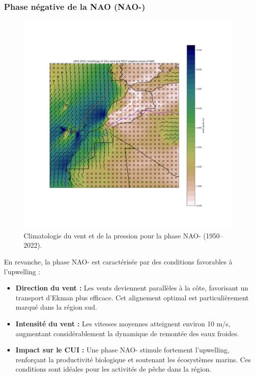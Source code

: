 \subsubsection*{Phase négative de la NAO (NAO-)}
\begin{figure}[H]
\centering
\includegraphics[scale=0.3]{NEG_PHASE.png}
\caption{Climatologie du vent et de la pression pour la phase NAO- (1950–2022).}
\label{fig:nao_negative}
\end{figure}

En revanche, la phase NAO- est caractérisée par des conditions favorables à l’upwelling :
\begin{itemize}
    \item \textbf{Direction du vent :} Les vents deviennent parallèles à la côte, favorisant un transport d'Ekman plus efficace. Cet alignement optimal est particulièrement marqué dans la région sud.
    \item \textbf{Intensité du vent :} Les vitesses moyennes atteignent environ 10 m/s, augmentant considérablement la dynamique de remontée des eaux froides.
    \item \textbf{Impact sur le CUI :} Une phase NAO- stimule fortement l’upwelling, renforçant la productivité biologique et soutenant les écosystèmes marins. Ces conditions sont idéales pour les activités de pêche dans la région.
\end{itemize}

